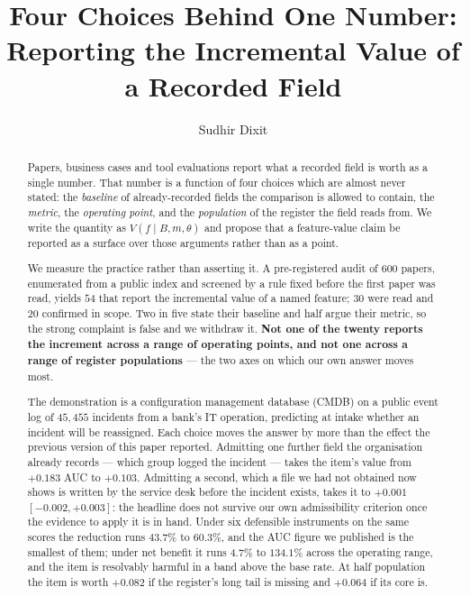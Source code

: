 \documentclass[preprint,12pt]{elsarticle}
\begin{document}
\begin{frontmatter}

\title{Four Choices Behind One Number: Reporting the Incremental Value
of a Recorded Field}

\author[ind]{Sudhir Dixit}
\address[ind]{Independent Researcher}

\begin{abstract}
Papers, business cases and tool evaluations report what a recorded field is
worth as a single number. That number is a function of four choices which are
almost never stated: the \emph{baseline} of already-recorded fields the
comparison is allowed to contain, the \emph{metric}, the \emph{operating
point}, and the \emph{population} of the register the field reads from. We
write the quantity as $V(f \mid B, m, \theta)$ and propose that a
feature-value claim be reported as a surface over those arguments rather than
as a point.

We measure the practice rather than asserting it. A pre-registered audit of
$600$ papers, enumerated from a public index and screened by a rule fixed
before the first paper was read, yields $54$ that report the incremental value
of a named feature; $30$ were read and $20$ confirmed in scope. Two in five
state their baseline and half argue their metric, so the strong complaint is
false and we withdraw it. \textbf{Not one of the twenty reports the increment
across a range of operating points, and not one across a range of register
populations} --- the two axes on which our own answer moves most.

The demonstration is a configuration management database (CMDB) on a public
event log of $45{,}455$ incidents from a bank's IT operation, predicting at
intake whether an incident will be reassigned. Each choice moves the answer by
more than the effect the previous version of this paper reported. Admitting
one further field the organisation already records --- which group logged the
incident --- takes the item's value from $+0.183$ AUC to $+0.103$. Admitting a
second, which a file we had not obtained now shows is written by the service
desk before the incident exists, takes it to $+0.001$ $[-0.002,+0.003]$: the
headline does not survive our own admissibility criterion once the evidence to
apply it is in hand. Under six defensible instruments on the same scores the
reduction runs $43.7\%$ to $60.3\%$, and the AUC figure we published is the
smallest of them; under net benefit it runs $4.7\%$ to $134.1\%$ across the
operating range, and the item is resolvably harmful in a band above the base
rate. At half population the item is worth $+0.082$ if the register's long
tail is missing and $+0.064$ if its core is.


\end{abstract}
\end{frontmatter}
\end{document}
